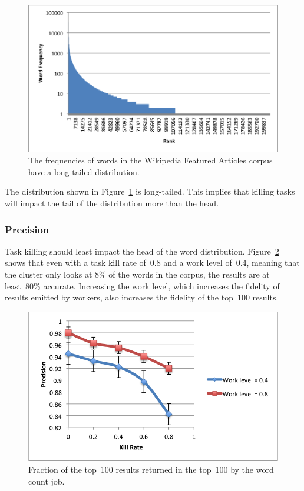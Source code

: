 \documentclass[12pt,twocolumn]{article}
\begin{document}
\begin{figure}
\includegraphics[width=\linewidth]{long-tail-ranks.png}
\caption{The frequencies of words in the Wikipedia Featured Articles corpus have a long-tailed distribution.}
\label{fig:wordDist}
\end{figure}

The distribution shown in Figure~\ref{fig:wordDist} is long-tailed. This implies that killing
tasks will impact the tail of the distribution more than the head.

\subsubsection{Precision}
Task killing should least impact the head of the word distribution.
Figure~\ref{fig:precision} shows that even with a task kill rate of~0.8 and a work level of~0.4,
meaning that the cluster only looks at 8\% of the words in the corpus, the results
are at least~80\% accurate. Increasing the work level, which increases the fidelity of
results emitted by workers, also increases the fidelity of the top~100 results.


\begin{figure}
\includegraphics[width=\linewidth]{top-100-precision.png}
\caption{Fraction of the top~100 results returned in the top~100 by the word count job.}
\label{fig:precision}
\end{figure}
\end{document}
